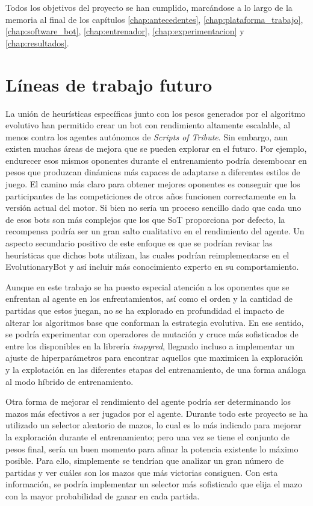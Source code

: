 Todos los objetivos del proyecto se han cumplido, marcándose a lo largo de la memoria al final de los capítulos \ref{chap:antecedentes}, \ref{chap:plataforma_trabajo}, 
\ref{chap:software_bot}, \ref{chap:entrenador}, \ref{chap:experimentacion} y \ref{chap:resultados}.

\section{Líneas de trabajo futuro} \label{sec:trabajo_futuro}

La unión de heurísticas específicas junto con los pesos generados por el algoritmo evolutivo han permitido crear un bot con rendimiento altamente escalable, al menos contra los agentes autónomos de \textit{Scripts of Tribute}. Sin embargo, aun existen muchas áreas de mejora que se pueden explorar en el futuro. Por ejemplo, endurecer esos mismos oponentes durante el entrenamiento podría desembocar en pesos que produzcan dinámicas más capaces de adaptarse a diferentes estilos de juego. El camino más claro para obtener mejores oponentes es conseguir que los participantes de las competiciones de otros años funcionen correctamente en la versión actual del motor. Si bien no sería un proceso sencillo dado que cada uno de esos bots son más complejos que los que SoT proporciona por defecto, la recompensa podría ser un gran salto cualitativo en el rendimiento del agente. Un aspecto secundario positivo de este enfoque es que se podrían revisar las heurísticas que dichos bots utilizan, las cuales podrían reimplementarse en el EvolutionaryBot y así incluir más conocimiento experto en su comportamiento.

Aunque en este trabajo se ha puesto especial atención a los oponentes que se enfrentan al agente en los enfrentamientos, así como el orden y la cantidad de partidas que estos juegan, no se ha explorado en profundidad el impacto de alterar los algoritmos base que conforman la estrategia evolutiva. En ese sentido, se podría experimentar con operadores de mutación y cruce más sofisticados de entre los disponibles en la librería \textit{inspyred}, llegando incluso a implementar un ajuste de hiperparámetros para encontrar aquellos que maximicen la exploración y la explotación en las diferentes etapas del entrenamiento, de una forma análoga al modo híbrido de entrenamiento.

Otra forma de mejorar el rendimiento del agente podría ser determinando los mazos más efectivos a ser jugados por el agente. Durante todo este proyecto se ha utilizado un selector aleatorio de mazos, lo cual es lo más indicado para mejorar la exploración durante el entrenamiento; pero una vez se tiene el conjunto de pesos final, sería un buen momento para afinar la potencia existente lo máximo posible. Para ello, simplemente se tendrían que analizar un gran número de partidas y ver cuáles son los mazos que más victorias consiguen. Con esta información, se podría implementar un selector más sofisticado que elija el mazo con la mayor probabilidad de ganar en cada partida.


